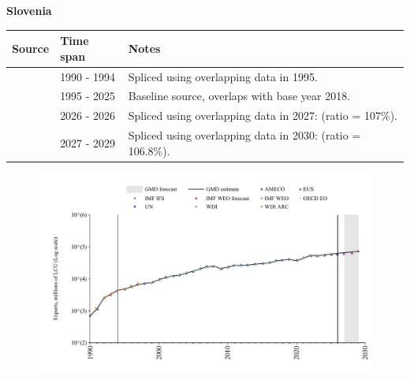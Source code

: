 \documentclass[12pt,a4paper,landscape]{article}
\begin{document}
\begin{adjustbox}{max totalsize={\paperwidth}{\paperheight},center}
\begin{minipage}[t][\textheight][t]{\textwidth}
\vspace*{0.5cm}
{}
\begin{center}
{\Large\bfseries Slovenia}
\end{center}
\vspace{0.5cm}
\begin{table}[H]
\centering
\small
\begin{tabular}{|l|l|l|}
\hline
\textbf{Source} & \textbf{Time span} & \textbf{Notes} \\
\hline
\rowcolor{white}\cite{AMECO}& 1990 - 1994 &Spliced using overlapping data in 1995.\\
\rowcolor{lightgray}\cite{OECD_EO}& 1995 - 2025 &Baseline source, overlaps with base year 2018.\\
\rowcolor{white}\cite{AMECO}& 2026 - 2026 &Spliced using overlapping data in 2027: (ratio = 107\%).\\
\rowcolor{lightgray}\cite{IMF_WEO_forecast}& 2027 - 2029 &Spliced using overlapping data in 2030: (ratio = 106.8\%).\\
\hline
\end{tabular}
\end{table}
\begin{figure}[H]
\centering
\includegraphics[width=\textwidth,height=0.6\textheight,keepaspectratio]{graphs/SVN_exports.pdf}
\end{figure}
\end{minipage}
\end{adjustbox}
\end{document}
